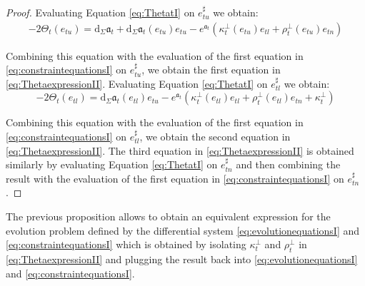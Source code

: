 \documentclass[10pt,reqno,a4paper]{amsart}
\theoremstyle{plain}
\theoremstyle{definition}
\theoremstyle{remark}
\theoremstyle{remark}
\def\dd{\mathrm{d}}
\def\fra{\mathfrak{a}}
\renewcommand{\(}{ (}
\renewcommand{\)}{ )}
\begin{document}
\begin{proof}
Evaluating Equation \eqref{eq:ThetatI} on $e_{tu}^{\sharp}$ we obtain:
\begin{eqnarray*}
-2 \Theta_t(e_{tu}) = \dd_{\Sigma} \fra_t   + \dd_{\Sigma} \fra_t (e_{tu}) e_{tu} - e^{\fra_t} (\kappa^{\perp}_t (e_{tu}) e_{tl} + \rho^{\perp}_t(e_{tu}) e_{tn})
\end{eqnarray*}

\noindent
Combining this equation with the evaluation of the first equation in \eqref{eq:constraintequationsI} on $e_{tu}^{\sharp}$, we obtain the first equation in \eqref{eq:ThetaexpressionII}. Evaluating Equation \eqref{eq:ThetatI} on $e_{tl}^{\sharp}$ we obtain:
\begin{equation*}
-2 \Theta_t (e_{tl})= \dd_{\Sigma} \fra_t(e_{tl})  e_{tu} - e^{\fra_t} (\kappa^{\perp}_t (e_{tl})   e_{tl} + \rho^{\perp}_t(e_{tl})  e_{tn} + \kappa^{\perp}_t)
\end{equation*}

\noindent
Combining this equation with the evaluation of the first equation in \eqref{eq:constraintequationsI} on $e_{tl}^{\sharp}$, we obtain the second equation in \eqref{eq:ThetaexpressionII}. The third equation in \eqref{eq:ThetaexpressionII} is obtained similarly by evaluating Equation \eqref{eq:ThetatI} on $e_{tn}^{\sharp}$ and then combining the result with the evaluation of the first equation in \eqref{eq:constraintequationsI} on $e_{tn}^{\sharp}$.
\end{proof}

\noindent
The previous proposition allows to obtain an equivalent expression for the evolution problem defined by the differential system \eqref{eq:evolutionequationsI} and \eqref{eq:constraintequationsI} which is obtained by isolating $\kappa^{\perp}_t$ and $\rho^{\perp}_t$ in \eqref{eq:ThetaexpressionII} and plugging the result back into \eqref{eq:evolutionequationsI} and \eqref{eq:constraintequationsI}.
\end{document}
